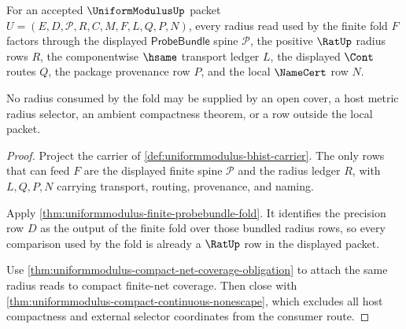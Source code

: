 \begin{theorem}
\label{thm:uniformmodulus-probebundle-radius-source-exhaustion}
For an accepted $\UniformModulusUp$ packet $U=(E,D,\mathcal{P},R,C,M,F,L,Q,P,N)$, every radius read used by the finite fold $F$ factors through the displayed $\mathsf{ProbeBundle}$ spine $\mathcal{P}$, the positive $\RatUp$ radius rows $R$, the componentwise $\hsame$ transport ledger $L$, the displayed $\Cont$ routes $Q$, the package provenance row $P$, and the local $\NameCert$ row $N$.

No radius consumed by the fold may be supplied by an open cover, a host metric radius selector, an ambient compactness theorem, or a row outside the local packet.
\end{theorem}
\begin{proof}
Project the carrier of \autoref{def:uniformmodulus-bhist-carrier}. The only rows that can feed $F$ are the displayed finite spine $\mathcal{P}$ and the radius ledger $R$, with $L,Q,P,N$ carrying transport, routing, provenance, and naming.

Apply \autoref{thm:uniformmodulus-finite-probebundle-fold}. It identifies the precision row $D$ as the output of the finite fold over those bundled radius rows, so every comparison used by the fold is already a $\RatUp$ row in the displayed packet.

Use \autoref{thm:uniformmodulus-compact-net-coverage-obligation} to attach the same radius reads to compact finite-net coverage. Then close with \autoref{thm:uniformmodulus-compact-continuous-nonescape}, which excludes all host compactness and external selector coordinates from the consumer route.
\end{proof}

